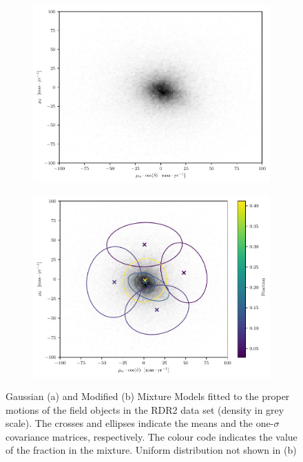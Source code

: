 \begin{figure}[ht!]
    \centering
    \begin{subfigure}[t]{0.45\textwidth}
        \includegraphics[page=3,width=\textwidth]{background/Figures/GMM-PM-BIC=15.pdf}
        \caption{}
        \label{fig:fpmGMM}
    \end{subfigure}
    \begin{subfigure}[t]{0.45\textwidth}
      \includegraphics[page=1,width=\textwidth]{background/Figures/GMM-PM-BIC2-U+7G.pdf}
        \caption{}
        \label{fig:fpmMMM} 
    \end{subfigure}
\caption{Gaussian (a) and Modified (b) Mixture Models fitted to the proper motions of the field objects in the RDR2 data set (density in grey scale). The crosses and ellipses indicate the means and the one-$\sigma$ covariance matrices, respectively. The colour code indicates the value of the fraction in the mixture. Uniform distribution not shown in (b)}
\label{fig:GMMvsMMM}
\end{figure}

